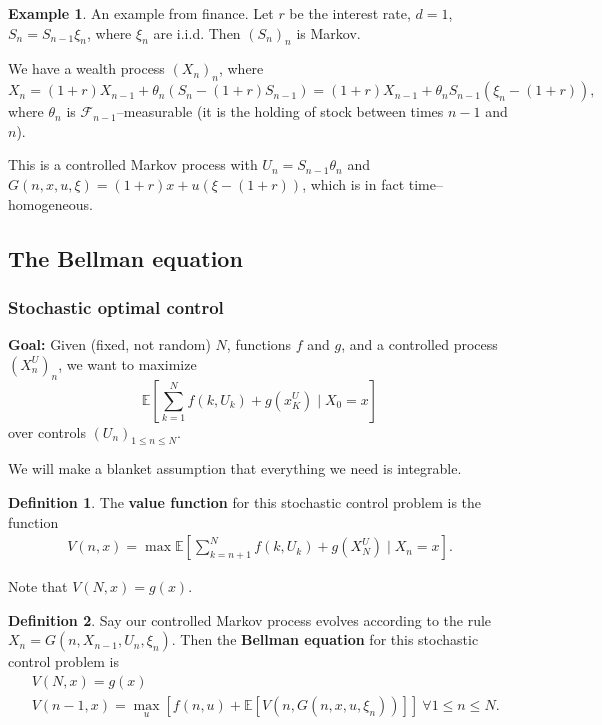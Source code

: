 \documentclass{article}
\theoremstyle{definition}
\newtheorem{example}{Example}[section]
\newtheorem{defn}{Definition}[section]
\begin{document}
\begin{example}
    An example from finance. Let $r$ be the interest rate, $d=1$, $S_n = S_{n-1} \xi_n$, where $\xi_n$ are i.i.d. Then $(S_n)_n$ is Markov. 

    We have a wealth process $(X_n)_n$, where \[
    X_n = (1+r)X_{n-1} + \theta_n(S_n-(1+r)S_{n-1}) = (1+r)X_{n-1} + \theta_n S_{n-1}(\xi_n-(1+r)),
    \]
    where $\theta_n$ is $\mathcal{F}_{n-1}$--measurable (it is the holding of stock between times $n-1$ and $n$).
    \vspace{1mm}
    
    This is a controlled Markov process with $U_n = S_{n-1}\theta_n$ and $G(n,x,u,\xi) = (1+r)x+u(\xi-(1+r))$, which is in fact time--homogeneous. 
\end{example}

\subsection{The Bellman equation}

\subsubsection{Stochastic optimal control}

\textbf{Goal:} Given (fixed, not random) $N$, functions $f$ and $g$, and a controlled process $(X_n^U)_n$, we want to maximize \[
\mathbb{E}\left[\sum_{k=1}^{N} f(k,U_k)+g(x_K^U) \mid X_0=x \right]
\] over controls $(U_n)_{1\le n\le N}$.

We will make a blanket assumption that everything we need is integrable.

\begin{defn}
    The \textbf{value function} for this stochastic control problem is the function 
    \begin{align*}
        V(n,x) = \max \mathbb{E}\left[\sum_{k=n+1}^{N} f(k,U_k) + g(X_N^U) \mid X_n=x \right].
    \end{align*}
\end{defn}
Note that $V(N,x)=g(x)$. 

\begin{defn}
    Say our controlled Markov process evolves according to the rule $X_n=G(n,X_{n-1},U_n,\xi_n)$. Then the \textbf{Bellman equation} for this stochastic control problem is 
    \begin{align*}
        &V(N,x) = g(x) \\
        &V(n-1,x) = \max_{u} \left[f(n,u) + \mathbb{E}[V(n,G(n,x,u,\xi_n))] \right] ~\forall 1 \le n\le N.
    \end{align*} 
\end{defn}
\end{document}
